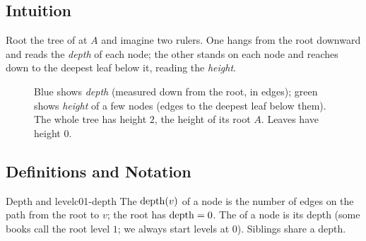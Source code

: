 \subsection{Intuition}

Root the tree of  at $A$ and imagine two rulers. One hangs from the
root downward and reads the \emph{depth} of each node; the other stands on each node and
reaches down to the deepest leaf below it, reading the \emph{height}.

\begin{figure}[H]
\centering
{}
\caption{Blue shows \emph{depth} (measured down from the root, in edges); green shows
\emph{height} of a few nodes (edges to the deepest leaf below them). The whole tree has
height $2$, the height of its root $A$. Leaves have height $0$.}\label{fig:c01-depth-height}
\end{figure}


\subsection{Definitions and Notation}

\begin{definition}{Depth and level}{c01-depth}
The  $\operatorname{depth}(v)$ of a node is the number of edges on the path from the root
to $v$; the root has $\operatorname{depth}=0$. The  of a node is its depth (some books call
the root level $1$; we always start levels at $0$). Siblings share a depth.
\end{definition}

